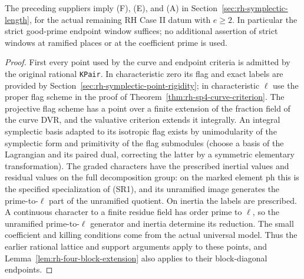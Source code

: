 \begin{theorem}
\label{thm:rh-four-point-premises}
The preceding suppliers imply (F), (E), and (A) in
Section~\ref{sec:rh-symplectic-length}, for the actual
remaining RH Case II datum with $e\ge2$. In particular
the strict good-prime endpoint window suffices; no
additional assertion of strict windows at ramified
places or at the coefficient prime is used.
\end{theorem}

\begin{proof}
First every point used by the curve and endpoint criteria
is admitted by the original rational \texttt{KPair}.
In characteristic zero its flag and exact labels are
provided by Section~\ref{sec:rh-symplectic-point-rigidity};
in characteristic $\ell$ use the proper flag scheme
in the proof of Theorem~\ref{thm:rh-sp4-curve-criterion}.
The projective flag scheme has a point over a finite
extension of the fraction field of the curve DVR,
and the valuative criterion extends it integrally.
An integral symplectic basis adapted to its isotropic
flag exists by unimodularity of the symplectic form
and primitivity of the flag submodules (choose a basis
of the Lagrangian and its paired dual, correcting
the latter by a symmetric elementary transformation).
The graded characters have the prescribed inertial
values and residual values on the full decomposition
group: on the marked element $\mathrm{ph}$ this
is the specified specialization of (SR1), and
its unramified image generates the prime-to-$\ell$
part of the unramified quotient. On inertia the
labels are prescribed. A continuous character to a
finite residue field has order prime to $\ell$,
so the unramified prime-to-$\ell$ generator and
inertia determine its reduction. The small
coefficient and killing conditions come from the
actual universal model. Thus the earlier rational
lattice and support arguments apply to these
points, and Lemma~\ref{lem:rh-four-block-extension}
also applies to their block-diagonal endpoints.


\end{proof}
